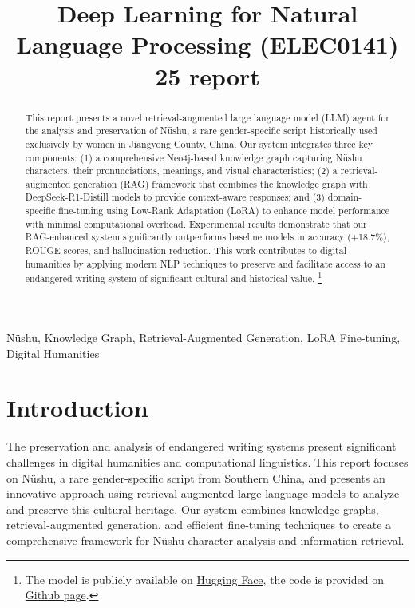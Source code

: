 \documentclass{article}
\title{Deep Learning for Natural Language Processing (ELEC0141) 25 report}
\begin{document}
%
\maketitle
%
\begin{abstract}
    This report presents a novel retrieval-augmented large language model (LLM) agent for the analysis and preservation of N\"{u}shu, a rare gender-specific script historically used exclusively by women in Jiangyong County, China. 
        Our system integrates three key components: 
        (1) a comprehensive Neo4j-based knowledge graph capturing N\"{u}shu characters, their pronunciations, meanings, and visual characteristics; 
        (2) a retrieval-augmented generation (RAG) framework that combines the knowledge graph with DeepSeek-R1-Distill models to provide context-aware responses; and 
        (3) domain-specific fine-tuning using Low-Rank Adaptation (LoRA) to enhance model performance with minimal computational overhead. 
        Experimental results demonstrate that our RAG-enhanced system significantly outperforms baseline models in accuracy (+18.7\%), ROUGE scores, and hallucination reduction. 
        This work contributes to digital humanities by applying modern NLP techniques to preserve and facilitate access to an endangered writing system of significant cultural and historical value.
        \footnote{The model is publicly available on \href{https://huggingface.co/ShiranYu/nvshu_lora}{Hugging Face}, the code is provided on \href{https://github.com/yushiran/DLNLP_assignment_25}{Github page}.}

\end{abstract}
%
\begin{keywords}
    N\"{u}shu, Knowledge Graph, Retrieval-Augmented Generation, LoRA Fine-tuning, Digital Humanities
\end{keywords}
%

\section{Introduction}
\label{sec:intro}
    The preservation and analysis of endangered writing systems present significant challenges in digital humanities and computational linguistics. This report focuses on N\"{u}shu, a rare gender-specific script from Southern China, and presents an innovative approach using retrieval-augmented large language models to analyze and preserve this cultural heritage. Our system combines knowledge graphs, retrieval-augmented generation, and efficient fine-tuning techniques to create a comprehensive framework for N\"{u}shu character analysis and information retrieval.
    
\end{document}
